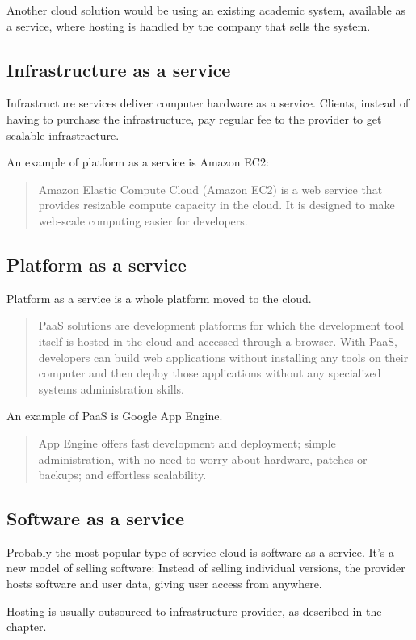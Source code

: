 Another cloud solution would be using an existing academic system, available as a service, where hosting is handled by the company that sells the system. 

\subsection{Infrastructure as a service}

Infrastructure services deliver computer hardware as a service. Clients, instead of having to purchase the infrastructure, pay regular fee to the provider to get scalable infrastracture.

An example of platform as a service is Amazon EC2:

\begin{quotation}
Amazon Elastic Compute Cloud (Amazon EC2) is a web service that provides resizable compute capacity in the cloud. It is designed to make web-scale computing easier for developers. \citep{amazon}
\end{quotation}

\subsection{Platform as a service}

Platform as a service is a whole platform moved to the cloud. 

\begin{quotation}
PaaS solutions are development platforms for which the development tool itself is hosted in the cloud and accessed through a browser. With PaaS, developers can build web applications without installing any tools on their computer and then deploy those applications without any specialized systems administration skills. \citep{paas}
\end{quotation}

An example of PaaS is Google App Engine.

\begin{quotation}
App Engine offers fast development and deployment; simple administration, with no need to worry about hardware, patches or backups; and effortless scalability. \citep{google_appengine}
\end{quotation}

\subsection{Software as a service}

Probably the most popular type of service cloud is software as a service. It’s a new model of selling software: Instead of selling individual versions, the provider hosts software and user data, giving user access from anywhere.

Hosting is usually outsourced to infrastructure provider, as described in the chapter. 
